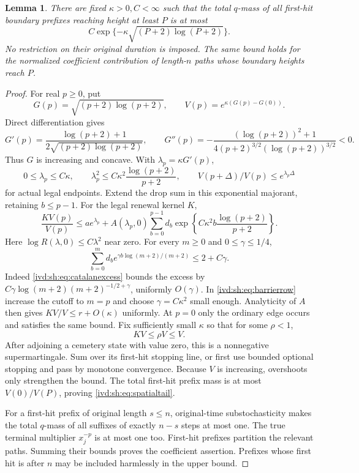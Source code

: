 \documentclass[11pt,letterpaper]{article}
\newtheorem{lemma}[theorem]{Lemma}
\theoremstyle{remark}\newtheorem{remark}[theorem]{Remark}
\numberwithin{equation}{section}
\begin{document}
\begin{lemma}\label{ivd:sh:lem:spatialtail}
There are fixed $\kappa>0,C<\infty$ such that the total $q$-mass
of all first-hit boundary prefixes reaching height at least $P$ is at
most
\begin{equation}\label{ivd:sh:eq:spatialtail}
 C\exp\{-\kappa\sqrt{(P+2)\log(P+2)}\}.
\end{equation}
No restriction on their original duration is imposed. The same bound
holds for the normalized coefficient contribution of length-$n$ paths
whose boundary heights reach $P$.
\end{lemma}
\begin{proof}
For real $p\ge0$, put
\[
 G(p)=\sqrt{(p+2)\log(p+2)},\qquad
 V(p)=e^{\kappa(G(p)-G(0))}.
\]
Direct differentiation gives
\[
 G'(p)=\frac{\log(p+2)+1}{2\sqrt{(p+2)\log(p+2)}},\qquad
 G''(p)=-\frac{(\log(p+2))^2+1}
 {4(p+2)^{3/2}(\log(p+2))^{3/2}}<0.
\]
Thus $G$ is increasing and concave. With
$\lambda_p=\kappa G'(p)$,
\[
 0\le\lambda_p\le C\kappa,\qquad
 \lambda_p^2\le C\kappa^2\frac{\log(p+2)}{p+2},\qquad
 V(p+\Delta)/V(p)\le e^{\lambda_p\Delta}
\]
for actual legal endpoints. Extend the drop sum in this exponential
majorant, retaining $b\le p-1$. For the legal renewal kernel $K$,
\begin{equation}\label{ivd:sh:eq:barrierrow}
 \frac{KV(p)}{V(p)}\le ae^{\lambda_p}+A(\lambda_p,0)
 \sum_{b=0}^{p-1}d_b
 \exp\left\{C\kappa^2b\frac{\log(p+2)}{p+2}\right\}.
\end{equation}
Here $\log R(\lambda,0)\le C\lambda^2$ near zero.
For every $m\ge0$ and $0\le\gamma\le1/4$,
\begin{equation}\label{ivd:sh:eq:barriercatalan}
 \sum_{b=0}^m d_b e^{\gamma b\log(m+2)/(m+2)}\le2+C\gamma.
\end{equation}
Indeed \eqref{ivd:sh:eq:catalanexcess} bounds the excess by
$C\gamma\log(m+2)(m+2)^{-1/2+\gamma}$, uniformly $O(\gamma)$.
In \eqref{ivd:sh:eq:barrierrow} increase the cutoff to $m=p$ and choose
$\gamma=C\kappa^2$ small enough. Analyticity of $A$ then gives
$KV/V\le r+O(\kappa)$ uniformly. At $p=0$ only the ordinary edge
occurs and satisfies the same bound. Fix sufficiently small $\kappa$
so that for some $\rho<1$,
\begin{equation}\label{ivd:sh:eq:barriersuper}
 KV\le\rho V\le V.
\end{equation}
After adjoining a cemetery state with value zero, this is a nonnegative
supermartingale. Sum over its first-hit stopping line, or first use
bounded optional stopping and pass by monotone convergence.
Because $V$ is increasing, overshoots only strengthen the bound.
The total first-hit prefix mass is at most $V(0)/V(P)$, proving
\eqref{ivd:sh:eq:spatialtail}.

For a first-hit prefix of original length $s\le n$, original-time
substochasticity makes the total $q$-mass of all suffixes of exactly
$n-s$ steps at most one. The true terminal multiplier $x_j^{-p}$
is at most one too. First-hit prefixes partition the relevant paths.
Summing their bounds proves the coefficient assertion. Prefixes whose
first hit is after $n$ may be included harmlessly in the upper bound.
\end{proof}
\end{document}
